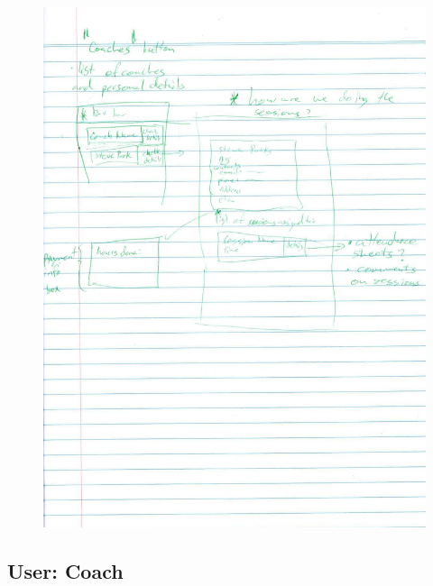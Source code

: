\documentclass{l3proj}
\begin{document}
{
\begin{figure}[h]
\centering
\includegraphics[scale=0.50]{0085_001-page-009.jpg}
\end{figure}
}

\pagebreak
\subsection{User: Coach}
\end{document}
